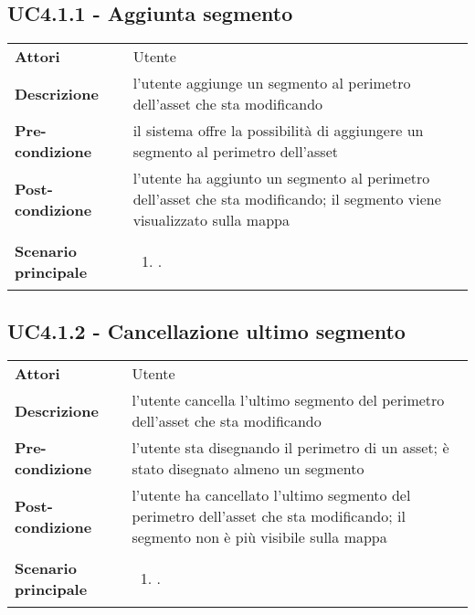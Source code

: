 \subsection{UC4.1.1 - Aggiunta segmento} 
\label{sssec:UC4.1.1} 
\def\arraystretch{1.5}
\begin{tabularx}{\textwidth}{l|p{}}
	\rowcolor{I} \multicolumn{2}{c}{\color{white}\textbf{UC4.1.1 - Aggiunta segmento}} \\
	\toprule
	\endhead
	\textbf{Attori} & Utente\\
	\textbf{Descrizione} & l'utente aggiunge un segmento al perimetro dell'asset che sta modificando\\
	\textbf{Pre-condizione} & il sistema offre la possibilità di aggiungere un segmento al perimetro dell'asset\\
	\textbf{Post-condizione} & l'utente ha aggiunto un segmento al perimetro dell'asset che sta modificando; il segmento viene visualizzato sulla mappa\\
	\textbf{Scenario principale} & \vspace{-1.2em}\begin{enumerate}[leftmargin=*,noitemsep,nosep]
		\item \nameref{sssec:UC4.1.1}.
	\end{enumerate}\\
	\bottomrule
\end{tabularx}
\subsection{UC4.1.2 - Cancellazione ultimo segmento} 
\label{sssec:UC4.1.2} 
\def\arraystretch{1.5}
\begin{tabularx}{\textwidth}{l|p{}}
	\rowcolor{I} \multicolumn{2}{c}{\color{white}\textbf{UC4.1.2 - Cancellazione ultimo segmento}} \\
	\toprule
	\endhead
	\textbf{Attori} & Utente\\
	\textbf{Descrizione} & l'utente cancella l'ultimo segmento del perimetro dell'asset che sta modificando\\
	\textbf{Pre-condizione} & l'utente sta disegnando il perimetro di un asset; è stato disegnato almeno un segmento\\
	\textbf{Post-condizione} & l'utente ha cancellato l'ultimo segmento del perimetro dell'asset che sta modificando; il segmento non è più visibile sulla mappa\\
	\textbf{Scenario principale} & \vspace{-1.2em}\begin{enumerate}[leftmargin=*,noitemsep,nosep]
		\item \nameref{sssec:UC4.1.2}.
	\end{enumerate}\\
	\bottomrule
\end{tabularx}
